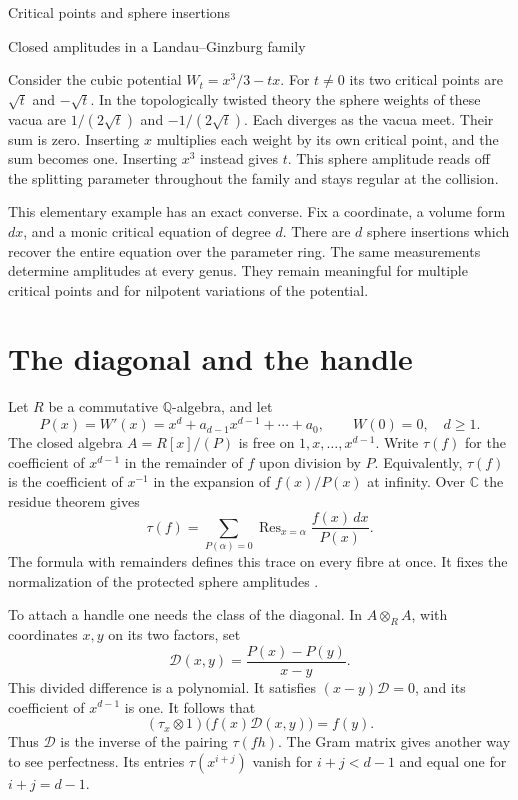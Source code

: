 \documentclass[11pt]{article}
\newcommand{\Res}{\operatorname{Res}}
\begin{document}
\begin{center}
{\LARGE Critical points and sphere insertions\par}
\smallskip
{\large Closed amplitudes in a Landau--Ginzburg family\par}
\end{center}

\noindent
Consider the cubic potential \(W_t=x^3/3-tx\). For \(t\ne0\) its two
critical points are \(\sqrt t\) and \(-\sqrt t\). In the topologically
twisted theory the sphere weights of these vacua are
\(1/(2\sqrt t)\) and \(-1/(2\sqrt t)\). Each diverges as the vacua
meet. Their sum is zero. Inserting \(x\) multiplies each weight by
its own critical point, and the sum becomes one. Inserting \(x^3\)
instead gives \(t\). This sphere amplitude reads off the splitting
parameter throughout the family and stays regular at the collision.

This elementary example has an exact converse. Fix a coordinate, a
volume form \(dx\), and a monic critical equation of degree \(d\).
There are \(d\) sphere insertions which recover the entire equation
over the parameter ring. The same measurements determine amplitudes
at every genus. They remain meaningful for multiple critical points
and for nilpotent variations of the potential.

\section{The diagonal and the handle}

Let \(R\) be a commutative \(\mathbb Q\)-algebra, and let
\[
 P(x)=W'(x)=x^d+a_{d-1}x^{d-1}+\cdots+a_0,\qquad W(0)=0,\quad d\ge1 .
\]
The closed algebra \(A=R[x]/(P)\) is free on \(1,x,\ldots,x^{d-1}\).
Write \(\tau(f)\) for the coefficient of \(x^{d-1}\) in the remainder
of \(f\) upon division by \(P\). Equivalently, \(\tau(f)\) is the
coefficient of \(x^{-1}\) in the expansion of \(f(x)/P(x)\) at
infinity. Over \(\mathbb C\) the residue theorem gives
\[
 \tau(f)=\sum_{P(\alpha)=0}
 \Res_{x=\alpha}\frac{f(x)\,dx}{P(x)} .
\]
The formula with remainders defines this trace on every fibre at once.
It fixes the normalization of the protected sphere amplitudes
\cite{vafa}.

To attach a handle one needs the class of the diagonal. In
\(A\otimes_R A\), with coordinates \(x,y\) on its two factors, set
\[
 \mathcal D(x,y)=\frac{P(x)-P(y)}{x-y}.
\]
This divided difference is a polynomial. It satisfies
\((x-y)\mathcal D=0\), and its coefficient of \(x^{d-1}\) is one.
It follows that
\[
 (\tau_x\otimes 1)\bigl(f(x)\mathcal D(x,y)\bigr)=f(y).
\]
Thus \(\mathcal D\) is the inverse of the pairing \(\tau(fh)\).
The Gram matrix gives another way to see perfectness. Its entries
\(\tau(x^{i+j})\) vanish for \(i+j<d-1\) and equal one for
\(i+j=d-1\).
\end{document}
